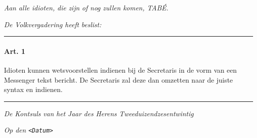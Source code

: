 \emph{Aan alle idioten, die zijn of nog zullen komen, TABÉ.}

\emph{De Volkvergadering heeft beslist:}

\begin{center}\rule{0.5\linewidth}{0.5pt}\end{center}

\hypertarget{art.-1}{%
\paragraph{Art. 1}\label{art.-1}}

Idioten kunnen wetsvoorstellen indienen bij de Secretaris in de vorm van
een Messenger tekst bericht. De Secretaris zal deze dan omzetten naar de
juiste syntax en indienen.

\begin{center}\rule{0.5\linewidth}{0.5pt}\end{center}

\emph{De Kontsuls van het Jaar des Herens Tweeduizendzesentwintig}

\emph{Op den \texttt{\textless{}Datum\textgreater{}}}
